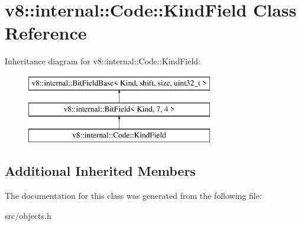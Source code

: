 \hypertarget{classv8_1_1internal_1_1_code_1_1_kind_field}{}\section{v8\+:\+:internal\+:\+:Code\+:\+:Kind\+Field Class Reference}
\label{classv8_1_1internal_1_1_code_1_1_kind_field}
Inheritance diagram for v8\+:\+:internal\+:\+:Code\+:\+:Kind\+Field\+:\begin{figure}[H]
\begin{center}
\leavevmode
\includegraphics[height=3.000000cm]{classv8_1_1internal_1_1_code_1_1_kind_field}
\end{center}
\end{figure}
\subsection*{Additional Inherited Members}


The documentation for this class was generated from the following file\+:\begin{DoxyCompactItemize}
\item 
src/objects.\+h\end{DoxyCompactItemize}
